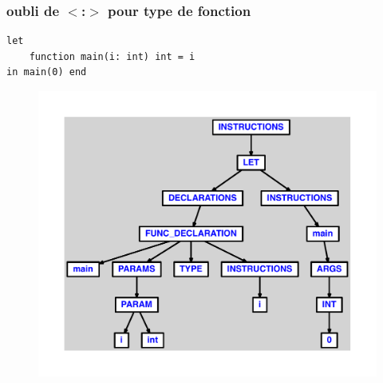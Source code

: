 \documentclass{article}
\begin{document}
\subsubsection{oubli de $ < $:$ > $ pour type de fonction}
\begin{lstlisting}
let
	function main(i: int) int = i
in main(0) end
\end{lstlisting}
\newpage
\begin{figure}[H]
\centering
\includegraphics[max width=\textwidth]{ast/ast_221.pdf}
\end{figure}
\newpage
\end{document}
